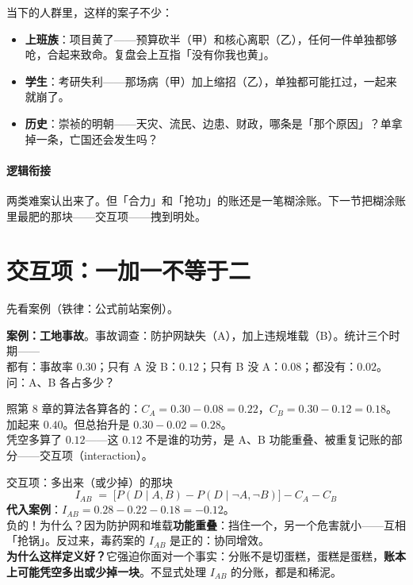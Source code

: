 \documentclass[../../main2.tex]{subfiles}
\begin{document}
当下的人群里，这样的案子不少：

\begin{itemize}
	\item \textbf{上班族}：项目黄了——预算砍半（甲）和核心离职（乙），任何一件单独都够呛，合起来致命。复盘会上互指「没有你我也黄」。
	\item \textbf{学生}：考研失利——那场病（甲）加上缩招（乙），单独都可能扛过，一起来就崩了。
	\item \textbf{历史}：崇祯的明朝——天灾、流民、边患、财政，哪条是「那个原因」？单拿掉一条，亡国还会发生吗？
\end{itemize}

\paragraph*{逻辑衔接}
	两类难案认出来了。但「合力」和「抢功」的账还是一笔糊涂账。下一节把糊涂账里最肥的那块——交互项——拽到明处。

\section{交互项：一加一不等于二}
\label{sec:multiple-interaction}

先看案例（铁律：公式前站案例）。

\begin{examplebox}
	\textbf{案例：工地事故}。事故调查：防护网缺失（A），加上违规堆载（B）。统计三个时期——\\
	都有：事故率 $0.30$；只有 A 没 B：$0.12$；只有 B 没 A：$0.08$；都没有：$0.02$。\\
	问：A、B 各占多少？
\end{examplebox}

照第 8 章的算法各算各的：$C_A = 0.30 - 0.08 = 0.22$，$C_B = 0.30 - 0.12 = 0.18$。加起来 $0.40$。但总抬升是 $0.30 - 0.02 = 0.28$。\\
凭空多算了 $0.12$——这 $0.12$ 不是谁的功劳，是 A、B 功能重叠、被重复记账的部分——交互项（interaction）。

\begin{mathbox}{交互项：多出来（或少掉）的那块}
	\[
	I_{AB} \;=\; \big[P(D \mid A,B) - P(D \mid \neg A, \neg B)\big] - C_A - C_B
	\]
	\textbf{代入案例}：$I_{AB} = 0.28 - 0.22 - 0.18 = -0.12$。\\
	负的！为什么？因为防护网和堆载\textbf{功能重叠}：挡住一个，另一个危害就小——互相「抢锅」。反过来，毒药案的 $I_{AB}$ 是正的：协同增效。\\[0.5em]
	\textbf{为什么这样定义好？}它强迫你面对一个事实：分账不是切蛋糕，蛋糕是蛋糕，\textbf{账本上可能凭空多出或少掉一块}。不显式处理 $I_{AB}$ 的分账，都是和稀泥。
\end{mathbox}
\end{document}
